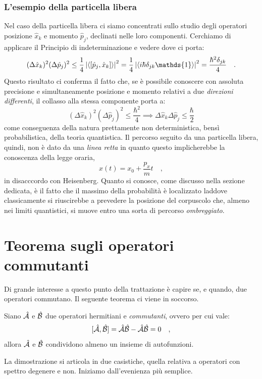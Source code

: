 \subsubsection{L'esempio della particella libera}
Nel caso della particella libera ci siamo concentrati sullo studio degli operatori posizione $\hat{x}_k$ e momento $\hat{p}_j$, declinati nelle loro componenti. Cerchiamo di applicare il Principio di indeterminazione e vedere dove ci porta:
\[
    (\Delta \hat{x}_k)^2 (\Delta \hat{p}_j)^2 \leq \frac{1}{4} \left| \avg{[\hat{p}_j, \hat{x}_k]}\right|^2 = \frac{1}{4} \left| \avg{i\hbar \delta_{jk}\mathds{1}}\right|^2 = \frac{\hbar^2 \delta_{jk}}{4} \quad.
\]
Questo risultato ci conferma il fatto che, se è possibile conoscere con assoluta precisione e simultaneamente posizione e momento relativi a due \emph{direzioni differenti}, il collasso alla stessa componente porta a:
\[
    (\Delta \hat{x}_k)^2 (\Delta \hat{p}_j)^2 \leq \frac{\hbar^2}{4} \implies \Delta \hat{x}_k \Delta \hat{p}_j \leq \frac{\hbar}{2} 
\]
come conseguenza della natura prettamente non deterministica, bensì probabilistica, della teoria quantistica. Il percorso seguito da una particella libera, quindi, non è dato da una \emph{linea retta} in quanto questo implicherebbe la conoscenza della legge oraria,
\[
    x(t) = x_0 + \frac{p_x}{m} t \quad,
\]
in disacccordo con Heisenberg. Quanto si conosce, come discusso nella sezione dedicata, è il fatto che il massimo della probabilità è localizzato laddove classicamente si riuscirebbe a prevedere la posizione del corpuscolo che, almeno nei limiti quantistici, si muove entro una sorta di percorso \emph{ombreggiato}.


\section{Teorema sugli operatori commutanti}
Di grande interesse a questo punto della trattazione è capire se, e quando, due operatori commutano. Il seguente teorema ci viene in soccorso.

\begin{teorema}
    Siano $\hat{\mathcal{A}}$ e $\hat{\mathcal{B}}$ due operatori hermitiani e \emph{commutanti}, ovvero per cui vale:
    \[
        [\hat{\mathcal{A}}, \hat{\mathcal{B}}] = \hat{\mathcal{A}}\hat{\mathcal{B}} - \hat{\mathcal{A}}\hat{\mathcal{B}} = 0 \quad,
    \]
    allora $\hat{\mathcal{A}}$ e $\hat{\mathcal{B}}$ condividono almeno un insieme di autofunzioni.
\end{teorema}
La dimostrazione si articola in due casistiche, quella relativa a operatori con spettro degenere e non. Iniziamo dall'evenienza più semplice.

